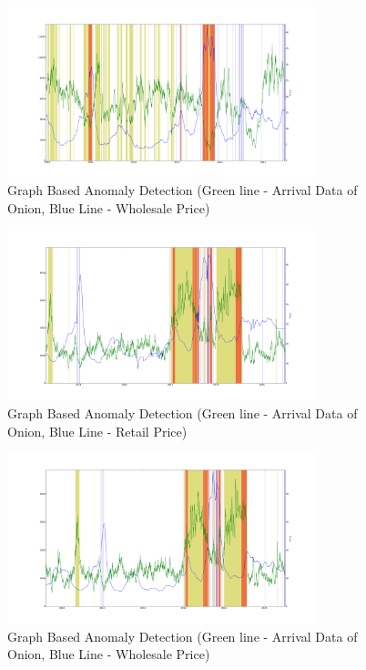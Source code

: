 			\begin{figure}[H]
		    	\centering
  		    	\includegraphics[width=0.8\textwidth]{graphs/12341.png}
		    	\caption{Graph Based Anomaly Detection (Green line - Arrival Data of Onion, Blue Line - Wholesale Price)}
		    	\label{fig:12341}
			\end{figure}
			
			
			\begin{figure}[H]
		    	\centering
  		    	\includegraphics[width=0.8\textwidth]{graphs/12322_delhi.png}
		    	\caption{Graph Based Anomaly Detection (Green line - Arrival Data of Onion, Blue Line - Retail Price)}
		    	\label{fig:12322_delhi}
			\end{figure}
			
			\begin{figure}[H]
		    	\centering
  		    	\includegraphics[width=0.8\textwidth]{graphs/12442_delhi.png}
		    	\caption{Graph Based Anomaly Detection (Green line - Arrival Data of Onion, Blue Line - Wholesale Price)}
		    	\label{fig:12442_delhi}
			\end{figure}	